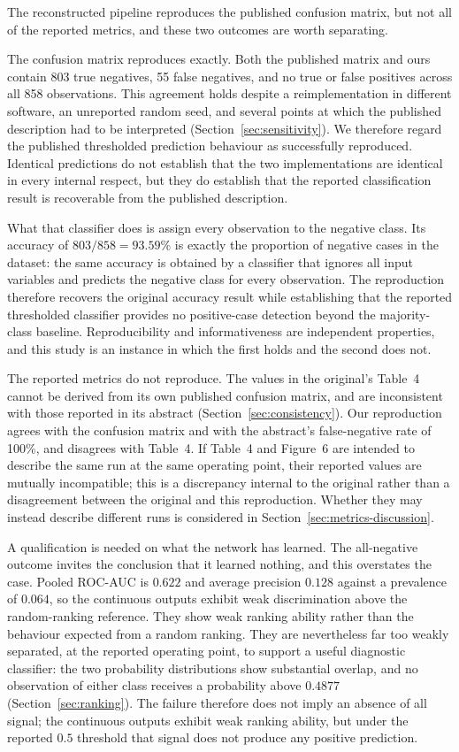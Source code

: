 The reconstructed pipeline reproduces the published confusion matrix, but not
all of the reported metrics, and these two outcomes are worth separating.

The confusion matrix reproduces exactly. Both the published matrix and ours
contain 803 true negatives, 55 false negatives, and no true or false positives
across all 858 observations. This agreement holds despite a reimplementation in
different software, an unreported random seed, and several points at which the
published description had to be interpreted
(Section~\ref{sec:sensitivity}). We therefore regard the published thresholded
prediction behaviour as successfully reproduced. Identical predictions do not
establish that the two implementations are identical in every internal respect,
but they do establish that the reported classification result is recoverable
from the published description.

What that classifier does is assign every observation to the negative class.
Its accuracy of $803/858 = 93.59\%$ is exactly the proportion of negative cases
in the dataset: the same accuracy is obtained by a classifier that ignores all
input variables and predicts the negative class for every observation. The
reproduction therefore recovers the original accuracy result while establishing
that the reported thresholded classifier provides no positive-case detection
beyond the majority-class baseline. Reproducibility and informativeness are
independent properties, and this study is an instance in which the first holds
and the second does not.

The reported metrics do not reproduce. The values in the original's Table~4
cannot be derived from its own published confusion matrix, and are inconsistent
with those reported in its abstract (Section~\ref{sec:consistency}). Our
reproduction agrees with the confusion matrix and with the abstract's
false-negative rate of 100\%, and disagrees with Table~4. If Table~4 and
Figure~6 are intended to describe the same run at the same operating point,
their reported values are mutually incompatible; this is a discrepancy internal
to the original rather than a disagreement between the original and this
reproduction. Whether they may instead describe different runs is considered in
Section~\ref{sec:metrics-discussion}.

A qualification is needed on what the network has learned. The all-negative
outcome invites the conclusion that it learned nothing, and this overstates the
case. Pooled ROC-AUC is $0.622$ and average precision $0.128$ against a
prevalence of $0.064$, so the continuous outputs exhibit weak discrimination
above the random-ranking reference. They show weak ranking ability rather than
the behaviour expected from a random ranking. They are nevertheless far too
weakly separated, at the reported operating point, to support a useful
diagnostic classifier: the two probability distributions show substantial
overlap, and no observation of either class receives a probability above
$0.4877$ (Section~\ref{sec:ranking}). The failure therefore does not imply an
absence of all signal; the continuous outputs exhibit weak ranking ability, but
under the reported $0.5$ threshold that signal does not produce any positive
prediction.

